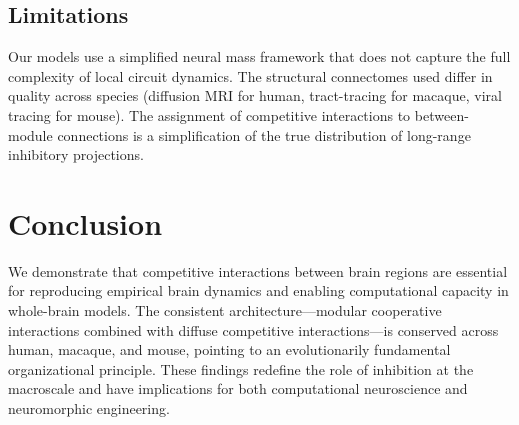 \documentclass[11pt]{article}
\begin{document}
\subsection{Limitations}
Our models use a simplified neural mass framework that does not capture the full complexity of local circuit dynamics. The structural connectomes used differ in quality across species (diffusion MRI for human, tract-tracing for macaque, viral tracing for mouse). The assignment of competitive interactions to between-module connections is a simplification of the true distribution of long-range inhibitory projections.

\section{Conclusion}

We demonstrate that competitive interactions between brain regions are essential for reproducing empirical brain dynamics and enabling computational capacity in whole-brain models. The consistent architecture---modular cooperative interactions combined with diffuse competitive interactions---is conserved across human, macaque, and mouse, pointing to an evolutionarily fundamental organizational principle. These findings redefine the role of inhibition at the macroscale and have implications for both computational neuroscience and neuromorphic engineering.



\end{document}
